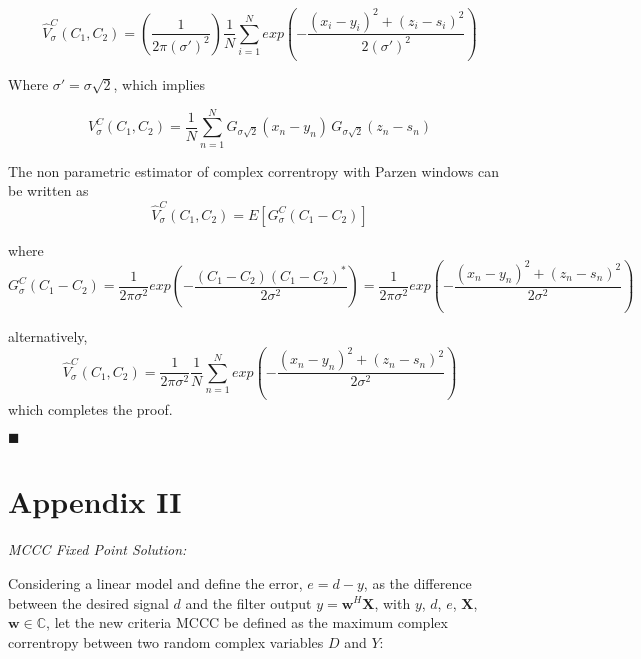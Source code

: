 \documentclass[preprint,12pt]{elsarticle}
\begin{document}
\begin{equation}\label{final}
\hat{V}^{C}_{\sigma}(C_{1},C_{2}) = \left ( \frac{1}{2\pi(\sigma')^2} \right )  \frac{1}{N}\sum\limits_{i=1}^N  exp \left( - \frac{(x_{i}-y_{i})^2 + (z_{i}-s_{i})^2}{2(\sigma')^2} \right ) 
\end{equation}

Where $\sigma' = \sigma\sqrt2$, which implies

\begin{equation}\nonumber
V^{C}_{\sigma}(C_{1},C_{2}) = \frac{1}{N}\sum\limits_{n=1}^N  G_{\sigma \sqrt{2}}(x_{n} - y_{n}) \,G_{\sigma \sqrt{2} }(z_{n} - s_{n}) 
\end{equation}


The non parametric estimator of complex correntropy with Parzen windows can be written as
\begin{equation}\label{finalabertaanexo}
\hat{V}^{C}_{\sigma}(C_{1},C_{2}) = E[G_{\sigma}^{C}(C_1 - C_2)]
\end{equation}

where
\begin{equation}\label{correntropiacomplexa}
G^{C}_{\sigma} (C_1 - C_2 )= \frac{1}{2\pi\sigma^2}exp \left ( -\frac{(C_{1} - C_{2}) (C_{1} - C_{2})^{*}}{2\sigma^2} \right ) = \frac{1}{2\pi\sigma^2} exp \left ( -\frac{(x_{n} - y_{n})^{2} + (z_{n} - s_{n})^{2} }{2\sigma^2} \right ) 
\end{equation}

alternatively,
\begin{equation}\label{finalabertaanexo2}
\hat{V}^{C}_{\sigma}(C_{1},C_{2}) = \frac{1}{2\pi\sigma^{2}} \frac{1}{N} \sum\limits_{n=1}^N exp \left ( -\frac{(x_{n} - y_{n})^{2} + (z_{n} - s_{n})^{2} }{2\sigma^2} \right ) 
\end{equation}
which completes the proof.
\begin{flushright}
$\blacksquare$
\end{flushright}

\section*{Appendix II}
\textit{MCCC Fixed Point Solution:}

Considering a linear model and define the error, $e = d - y$, as the difference between the desired signal $d$ and the filter output $y = \textbf{w}^H \textbf{X}$, with $y$, $d$, $e$, $\textbf{X}$, $\textbf{w} \in \mathbb{C}$, let the new criteria MCCC be defined as the maximum complex correntropy between two random complex variables $D$ and $Y$:
\end{document}
